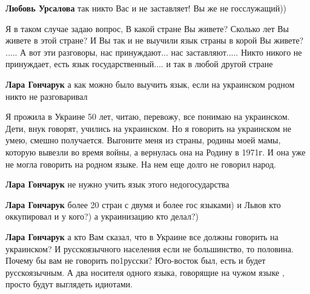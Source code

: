 \begin{itemize}
\begin{itemize}

\textbf{Любовь Урсалова} так никто Вас и не заставляет! Вы же не госслужащий))
\end{itemize}


Я в таком случае задаю вопрос, В какой стране Вы живете? Сколько лет Вы живете
в этой стране? И Вы так и не выучили язык страны в корой Вы живете? ..... А вот
эти разговоры, нас принуждают... нас заставляют..... Никто никого не
принуждает, есть язык государственный.... и так в любой другой стране

\begin{itemize}

\textbf{Лара Гончарук} а как можно было выучить язык, если на украинском родном никто не разговаривал


Я прожила в Украине 50 лет, читаю, перевожу, все понимаю на украинском. Дети,
внук говорят, учились на украинском. Но я говорить на украинском не умею, смешно
получается. Выгоните меня из страны, родины моей мамы, которую вывезли во время
войны, а вернулась она на Родину в 1971г. И она уже не могла говорить на родном
языке. На нем еще долго не говорил народ.


\textbf{Лара Гончарук} не нужно учить язык этого недогосударства


\textbf{Лара Гончарук} более 20 стран с двумя и более гос языками) и Львов кто
оккупировал и у кого?) а украинизацию кто делал?)


\textbf{Лара Гончарук} а кто Вам сказал, что в Украине все должны говорить на
украинском? И русскоязычного населения если не большинство, то половина. Почему
бы вам не говорить по1русски? Юго-восток был, есть и будет русскоязычным. А два
носителя одного языка, говорящие на чужом языке , просто будут выглядеть
идиотами.


\end{itemize}
\end{itemize}
